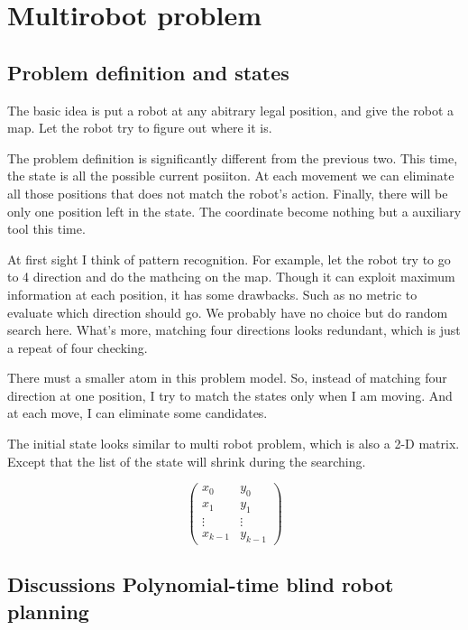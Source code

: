 \clearpage
\section{Multirobot problem}
\subsection{Problem definition and states}

The basic idea is put a robot at any abitrary legal position, and give the robot a map. Let the robot try to figure out where it is.

The problem definition is significantly different from the previous two. This time, the state is all the possible current posiiton. At each movement we can eliminate all those positions that does not match the robot's action. Finally, there will be only one position left in the state. The coordinate become nothing but a auxiliary tool this time.

At first sight I think of pattern recognition. For example, let the robot try to go to 4 direction and do the mathcing on the map. Though it can exploit maximum information at each position, it has some drawbacks. Such as no metric to evaluate which direction should go. We probably have no choice but do random search here. What's more, matching four directions looks redundant, which is just a repeat of four checking.

There must a smaller atom in this problem model. So, instead of matching four direction at one position, I try to match the states only when I am moving. And at each move, I can eliminate some candidates.

The initial state looks similar to multi robot problem, which is also a 2-D matrix. Except that the list of the state will shrink during the searching.



$$\begin{pmatrix}
x_0 & y_0 \\
x_1 & y_1 \\
\vdots & \vdots \\	
x_{k-1} & y_{k-1}
\end{pmatrix}$$









\subsection{Discussions Polynomial-time blind robot planning}